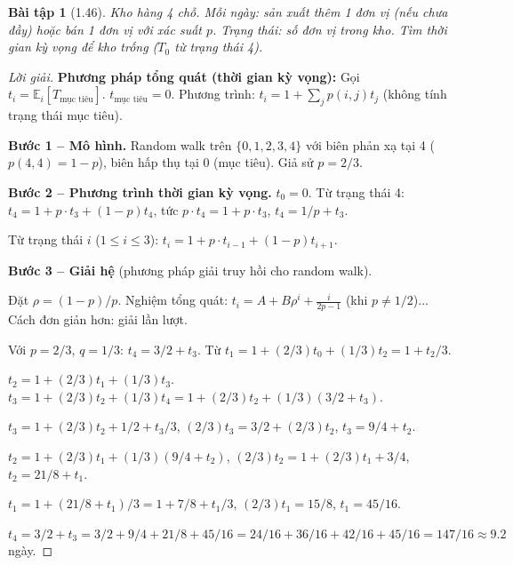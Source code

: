 \documentclass[8pt,a4paper]{article}
\newtheorem{exercise}{Bài tập}
\newenvironment{solution}{\begin{proof}[Lời giải]}{\end{proof}}
\newcommand{\E}{\mathbb{E}}
\begin{document}
\begin{exercise}[1.46]
Kho hàng 4 chỗ. Mỗi ngày: sản xuất thêm 1 đơn vị (nếu chưa đầy) hoặc bán 1 đơn vị với xác suất $p$. Trạng thái: số đơn vị trong kho. Tìm thời gian kỳ vọng để kho trống ($T_0$ từ trạng thái 4).
\end{exercise}
\begin{solution}
\textbf{Phương pháp tổng quát (thời gian kỳ vọng):} Gọi $t_i = \E_i[T_{\text{mục tiêu}}]$. $t_{\text{mục tiêu}} = 0$. Phương trình: $t_i = 1 + \sum_j p(i,j) t_j$ (không tính trạng thái mục tiêu).

\textbf{Bước 1 -- Mô hình.} Random walk trên $\{0,1,2,3,4\}$ với biên phản xạ tại 4 ($p(4,4) = 1-p$), biên hấp thụ tại 0 (mục tiêu). Giả sử $p = 2/3$.

\textbf{Bước 2 -- Phương trình thời gian kỳ vọng.}
$t_0 = 0$. Từ trạng thái 4: $t_4 = 1 + p \cdot t_3 + (1-p) t_4$, tức $p \cdot t_4 = 1 + p \cdot t_3$, $t_4 = 1/p + t_3$.

Từ trạng thái $i$ ($1 \leq i \leq 3$): $t_i = 1 + p \cdot t_{i-1} + (1-p) t_{i+1}$.

\textbf{Bước 3 -- Giải hệ} (phương pháp giải truy hồi cho random walk).

Đặt $\rho = (1-p)/p$. Nghiệm tổng quát: $t_i = A + B\rho^i + \frac{i}{2p-1}$ (khi $p \neq 1/2$)... Cách đơn giản hơn: giải lần lượt.

Với $p = 2/3$, $q = 1/3$: $t_4 = 3/2 + t_3$. Từ $t_1 = 1 + (2/3)t_0 + (1/3)t_2 = 1 + t_2/3$.

$t_2 = 1 + (2/3)t_1 + (1/3)t_3$. $t_3 = 1 + (2/3)t_2 + (1/3)t_4 = 1 + (2/3)t_2 + (1/3)(3/2 + t_3)$.

$t_3 = 1 + (2/3)t_2 + 1/2 + t_3/3$, $(2/3)t_3 = 3/2 + (2/3)t_2$, $t_3 = 9/4 + t_2$.

$t_2 = 1 + (2/3)t_1 + (1/3)(9/4 + t_2)$, $(2/3)t_2 = 1 + (2/3)t_1 + 3/4$, $t_2 = 21/8 + t_1$.

$t_1 = 1 + (21/8 + t_1)/3 = 1 + 7/8 + t_1/3$, $(2/3)t_1 = 15/8$, $t_1 = 45/16$.

$t_4 = 3/2 + t_3 = 3/2 + 9/4 + 21/8 + 45/16 = 24/16 + 36/16 + 42/16 + 45/16 = 147/16 \approx 9.2$ ngày.
\end{solution}
\end{document}

